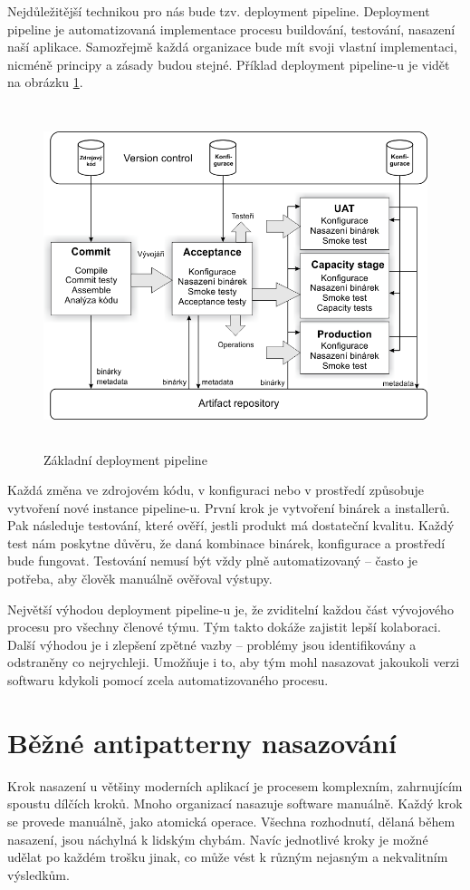Nejdůležitější technikou pro nás bude tzv. deployment pipeline. Deployment pipeline je automatizovaná implementace procesu buildování, testování, nasazení naší aplikace. Samozřejmě každá organizace bude mít svoji vlastní implementaci, nicméně principy a zásady budou stejné. Příklad deployment pipeline-u je vidět na obrázku \ref{fig:pipeline}.

\begin{figure}[]
  \centering
  \includegraphics[height=10cm]{fig/pipeline.png}
  \caption{Základní deployment pipeline}
  \label{fig:pipeline}
\end{figure}

Každá změna ve zdrojovém kódu, v konfiguraci nebo v prostředí způsobuje vytvoření nové instance pipeline-u. První krok je vytvoření binárek a installerů. Pak následuje testování, které ověří, jestli produkt má dostateční kvalitu. Každý test nám poskytne důvěru, že daná kombinace binárek, konfigurace a prostředí bude fungovat. Testování nemusí být vždy plně automatizovaný -- často je potřeba, aby člověk manuálně ověřoval výstupy. 

Největší výhodou deployment pipeline-u je, že zviditelní každou část vývojového procesu pro všechny členové týmu. Tým takto dokáže zajistit lepší kolaboraci. Další výhodou je i zlepšení zpětné vazby -- problémy jsou identifikovány a odstraněny co nejrychleji. Umožňuje i to, aby tým mohl nasazovat jakoukoli verzi softwaru kdykoli pomocí zcela automatizovaného procesu.

\section{Běžné antipatterny nasazování}
Krok nasazení u většiny moderních aplikací je procesem komplexním, zahrnujícím spoustu dílčích kroků. Mnoho organizací nasazuje software manuálně. Každý krok se provede manuálně, jako atomická operace. Všechna rozhodnutí, dělaná během nasazení, jsou náchylná k lidským chybám. Navíc jednotlivé kroky je možné udělat po každém trošku jinak, co může vést k různým nejasným a nekvalitním výsledkům.

